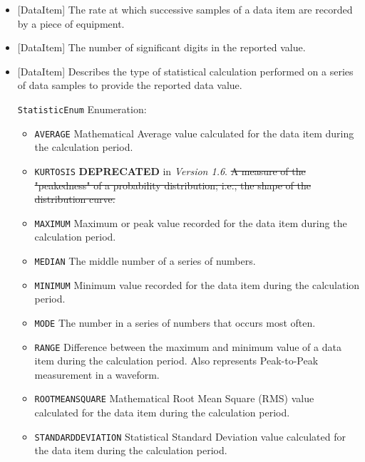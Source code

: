 \begin{itemize}
\item {}[DataItem] \newline The rate at which successive samples of a data item are recorded by a piece of equipment.

\item {}[DataItem] \newline The number of significant digits in the reported value.

\item {}[DataItem] \newline Describes the type of statistical calculation performed on a series of data samples to provide the reported data value.

\texttt{StatisticEnum} Enumeration:

\begin{itemize}
\item \texttt{AVERAGE} \newline Mathematical Average value calculated for the data item during the calculation period. 
\item \texttt{KURTOSIS} \newline \textbf{DEPRECATED} in \textit{Version 1.6}. \sout{A measure of the "peakedness" of a probability distribution; i.e., the shape of the distribution curve.} 
\item \texttt{MAXIMUM} \newline Maximum or peak value recorded for the data item during the calculation period. 
\item \texttt{MEDIAN} \newline The middle number of a series of numbers. 
\item \texttt{MINIMUM} \newline Minimum value recorded for the data item during the calculation period. 
\item \texttt{MODE} \newline The number in a series of numbers that occurs most often. 
\item \texttt{RANGE} \newline Difference between the maximum and minimum value of a data item during the calculation period. Also represents Peak-to-Peak measurement in a waveform. 
\item \texttt{ROOT\textunderscore MEAN\textunderscore SQUARE} \newline Mathematical Root Mean Square (RMS) value calculated for the data item during the calculation period. 
\item \texttt{STANDARD\textunderscore DEVIATION} \newline Statistical Standard Deviation value calculated for the data item during the calculation period. 
\end{itemize}



\end{itemize}
